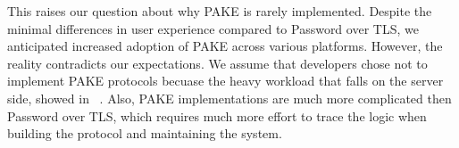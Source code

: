This raises our question about why PAKE is rarely implemented. 
Despite the minimal differences in user experience compared to Password over TLS, we anticipated increased adoption of PAKE across various platforms.
However, the reality contradicts our expectations.
We assume that developers chose not to implement PAKE protocols becuase the heavy workload that falls on the server side, showed in ~.
Also, PAKE implementations are much more complicated then Password over TLS, which requires much more effort to trace the logic when building the protocol and maintaining the system. 